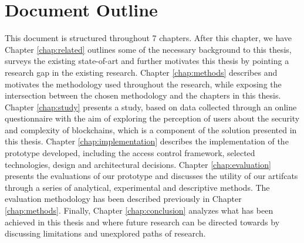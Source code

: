 \section{Document Outline}

This document is structured throughout 7 chapters. After this chapter, we have Chapter \ref{chap:related} outlines some of the necessary background to this thesis, surveys the existing state-of-art and further motivates this thesis by pointing a research gap in the existing research. Chapter \ref{chap:methods} describes and motivates the methodology used throughout the research, while exposing the intersection between the chosen methodology and the chapters in this thesis. Chapter \ref{chap:study} presents a study, based on data collected through an online questionnaire with the aim of exploring the perception of users about the security and complexity of blockchains, which is a component of the solution presented in this thesis. Chapter \ref{chap:implementation} describes the implementation of the prototype developed, including the access control framework, selected technologies, design and architectural decisions. Chapter \ref{chap:evaluation} presents the evaluations of our prototype and discusses the utility of our artifcats through a series of analytical, experimental and descriptive methods. The evaluation methodology has been described previously in Chapter \ref{chap:methods}. Finally, Chapter \ref{chap:conclusion} analyzes what has been achieved in this thesis and where future research can be directed towards by discussing limitations and unexplored paths of research.
